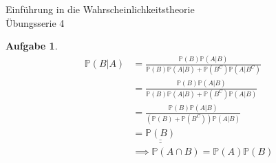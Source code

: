 \documentclass[11pt]{article}
\theoremstyle{break}
\newtheorem{task}{Aufgabe}
\begin{document}
\begin{center}
\Large{Einführung in die Wahrscheinlichkeitstheorie}\\
\large{Übungsserie 4}
\end{center}
\begin{task}
    \hfill\vspace{-5mm}
    \begin{align*}
        \mathbb{P}(B\vert A) &= \frac{\mathbb{P}(B)\mathbb{P}(A\vert B)}{\mathbb{P}(B)\mathbb{P}(A\vert B) + \mathbb{P}(B^C)\mathbb{P}(A\vert B^C)}\\
        &= \frac{\mathbb{P}(B)\mathbb{P}(A\vert B)}{\mathbb{P}(B)\mathbb{P}(A\vert B) + \mathbb{P}(B^C)\mathbb{P}(A\vert B)}\\
        &= \frac{\mathbb{P}(B)\mathbb{P}(A\vert B)}{(\mathbb{P}(B) + \mathbb{P}(B^C))\mathbb{P}(A\vert B)}\\
        &= \underline{\underline{\mathbb{P}(B)}}\\
        &\implies \mathbb{P}(A\cap B) = \mathbb{P}(A)\mathbb{P}(B)
    \end{align*}
    
\end{task}
\setcounter{task}{2}
\end{document}
